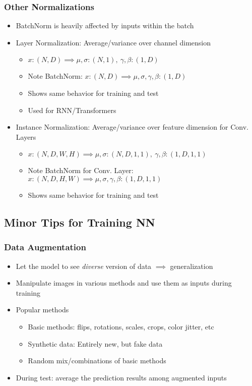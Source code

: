 \subsubsection*{Other Normalizations}
\begin{itemize}
    \item BatchNorm is heavily affected by inputs within the batch
    \item Layer Normalization: Average/variance over channel dimension
    \begin{itemize}
        \item $x:(N,D)\implies\mu,\sigma:(N,1),~\gamma,\beta:(1,D)$
        \item Note BatchNorm: $x:(N,D)\implies\mu,\sigma,\gamma,\beta:(1,D)$
        \item Shows same behavior for training and test
        \item Used for RNN/Transformers
    \end{itemize}
    \item Instance Normalization: Average/variance over feature dimension for Conv. Layers
    \begin{itemize}
        \item $x:(N,D,W,H)\implies\mu,\sigma:(N,D,1,1),~\gamma,\beta:(1,D,1,1)$
        \item Note BatchNorm for Conv. Layer: $x:(N,D,H,W)\implies\mu,\sigma,\gamma,\beta:(1,D,1,1)$
        \item Shows same behavior for training and test
    \end{itemize}
\end{itemize}
\begin{figures}
\end{figures}

\subsection{Minor Tips for Training NN}

\subsubsection*{Data Augmentation}
\begin{itemize}
    \item Let the model to see \textit{diverse} version of data $\implies$ generalization
    \item Manipulate images in various methods and use them as inputs during training
    \item Popular methods
    \begin{itemize}
        \item Basic methods: flips, rotations, scales, crops, color jitter, etc
        \item Synthetic data: Entirely new, but fake data
        \item Random mix/combinations of basic methods
    \end{itemize}
    \item During test: average the prediction results among augmented inputs
\end{itemize}

